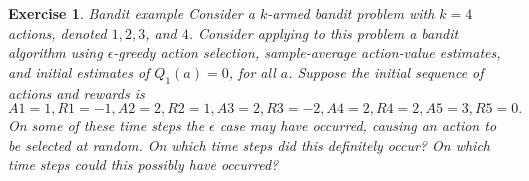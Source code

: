 \documentclass[answers]{exam}
\newtheorem{exercise}[theorem]{Exercise}
\theoremstyle{definition}
\theoremstyle{remark}
\newcommand{\e}{\epsilon}
\begin{document}
\begin{exercise}
Bandit example Consider a $k$-armed bandit problem with $k = 4$ actions, denoted $1, 2, 3$, and $4$. Consider applying to this problem a bandit algorithm using $\e$-greedy action selection, sample-average action-value estimates, and initial estimates of $Q_1(a) = 0$, for all $a$. Suppose the initial sequence of actions and rewards is $A1 = 1, R1 = -1, A2 = 2, R2 = 1, A3 = 2, R3 = -2, A4 = 2, R4 = 2, A5 = 3, R5 = 0.$ On some of these time steps the $\e$ case may have occurred, causing an action to be selected at random. On which time steps did this definitely occur? On which time steps could this possibly have occurred?
\end{exercise}
\end{document}

